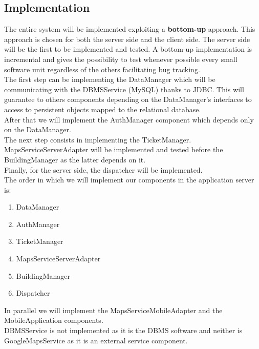 \subsection{Implementation}

The entire system will be implemented exploiting a \textbf{bottom-up} approach. This approach is chosen for both the server side and the client side. The server side will be the first to be implemented and tested. A bottom-up implementation is incremental and gives the possibility to test whenever possible every small software unit regardless of the others facilitating bug tracking.\\
\newline
The first step can be implementing the DataManager which will be communicating with the DBMSService (MySQL) thanks to JDBC. This will guarantee to others components depending on the DataManager's interfaces to access to persistent objects mapped to the relational database.\\
\newline
After that we will implement the AuthManager component which depends only on the DataManager.\\
The next step consists in implementing the TicketManager.\\
MapsServiceServerAdapter will be implemented and tested before the BuildingManager as the latter depends on it.\\
\newline
Finally, for the server side, the dispatcher will be implemented.\\
\newline
The order in which we will implement our components in the application server is:

\begin{enumerate}[label=\arabic*]
 \item DataManager
 \item AuthManager
 \item TicketManager
 \item MapsServiceServerAdapter
 \item BuildingManager
 \item Dispatcher
\end{enumerate}

In parallel we will implement the MapsServiceMobileAdapter and the MobileApplication components.\\
\newline
DBMSService is not implemented as it is the DBMS software and neither is GoogleMapsService as it is an external service component.\\
\newpage


